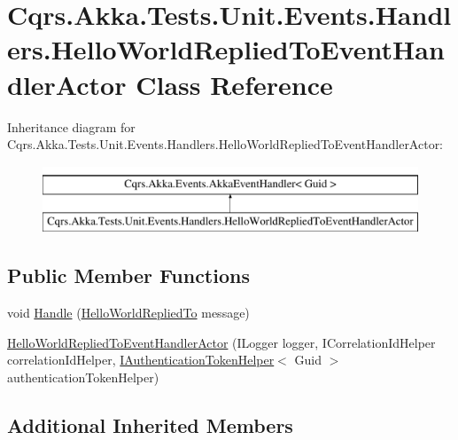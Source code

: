 \hypertarget{classCqrs_1_1Akka_1_1Tests_1_1Unit_1_1Events_1_1Handlers_1_1HelloWorldRepliedToEventHandlerActor}{}\section{Cqrs.\+Akka.\+Tests.\+Unit.\+Events.\+Handlers.\+Hello\+World\+Replied\+To\+Event\+Handler\+Actor Class Reference}
\label{classCqrs_1_1Akka_1_1Tests_1_1Unit_1_1Events_1_1Handlers_1_1HelloWorldRepliedToEventHandlerActor}
Inheritance diagram for Cqrs.\+Akka.\+Tests.\+Unit.\+Events.\+Handlers.\+Hello\+World\+Replied\+To\+Event\+Handler\+Actor\+:\begin{figure}[H]
\begin{center}
\leavevmode
\includegraphics[height=2.000000cm]{classCqrs_1_1Akka_1_1Tests_1_1Unit_1_1Events_1_1Handlers_1_1HelloWorldRepliedToEventHandlerActor}
\end{center}
\end{figure}
\subsection*{Public Member Functions}
\begin{DoxyCompactItemize}
\item 
void \hyperlink{classCqrs_1_1Akka_1_1Tests_1_1Unit_1_1Events_1_1Handlers_1_1HelloWorldRepliedToEventHandlerActor_a9d843860260cd66f8354b9df234a1663}{Handle} (\hyperlink{classCqrs_1_1Akka_1_1Tests_1_1Unit_1_1Events_1_1HelloWorldRepliedTo}{Hello\+World\+Replied\+To} message)
\item 
\hyperlink{classCqrs_1_1Akka_1_1Tests_1_1Unit_1_1Events_1_1Handlers_1_1HelloWorldRepliedToEventHandlerActor_a174cd0183fbe16aaa74f18320e871a5f}{Hello\+World\+Replied\+To\+Event\+Handler\+Actor} (I\+Logger logger, I\+Correlation\+Id\+Helper correlation\+Id\+Helper, \hyperlink{interfaceCqrs_1_1Authentication_1_1IAuthenticationTokenHelper}{I\+Authentication\+Token\+Helper}$<$ Guid $>$ authentication\+Token\+Helper)
\end{DoxyCompactItemize}
\subsection*{Additional Inherited Members}


